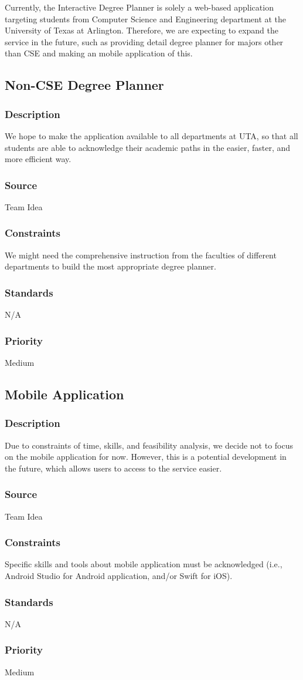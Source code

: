 Currently, the Interactive Degree Planner is solely a web-based application targeting students from Computer Science and Engineering department at the University of Texas at Arlington. Therefore, we are expecting to expand the service in the future, such as providing detail degree planner for majors other than CSE and making an mobile application of this.

\subsection{Non-CSE Degree Planner}
\subsubsection{Description}
We hope to make the application available to all departments at UTA, so that all students are able to acknowledge their academic paths in the easier, faster, and more efficient way.
\subsubsection{Source}
Team Idea
\subsubsection{Constraints}
We might need the comprehensive instruction from the faculties of different departments to build the most appropriate degree planner.
\subsubsection{Standards}
N/A
\subsubsection{Priority}
Medium

\subsection{Mobile Application}
\subsubsection{Description}
Due to constraints of time, skills, and feasibility analysis, we decide not to focus on the mobile application for now. However, this is a potential development in the future, which allows users to access to the service easier.
\subsubsection{Source}
Team Idea
\subsubsection{Constraints}
Specific skills and tools about mobile application must be acknowledged (i.e., Android Studio for Android application, and/or Swift for iOS).
\subsubsection{Standards}
N/A
\subsubsection{Priority}
Medium